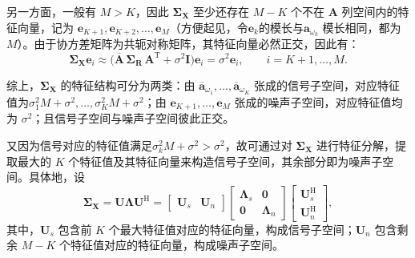 另一方面，一般有 \(M > K\)，因此 \(\mathbf{\Sigma}_{\mathbf{X}}\) 至少还存在 \(M-K\) 个不在 \(\mathbf{A}\) 列空间内的特征向量，记为 \(\bm{e}_{K+1},\bm{e}_{K+2},\dots,\bm{e}_M\)（方便起见，令\( \bm{e}_k \)的模长与\( \bm{a}_{\omega_k}\) 模长相同，都为\( M \)）。由于协方差矩阵为共轭对称矩阵，其特征向量必然正交，因此有：
\[
    \mathbf{\Sigma}_{\mathbf{X}} \bm{e}_i
    \approx \big(\overline{\mathbf{A}}\,\mathbf{\Sigma}_{\mathbf{R}}\,\mathbf{A}^{\mathrm{T}} + \sigma^2 \mathbf{I}\big)\bm{e}_i
    = \sigma^2 \bm{e}_i,\qquad i=K+1,\dots,M.
\]

综上，\(\mathbf{\Sigma}_{\mathbf{X}}\) 的特征结构可分为两类：由 \(\overline{\bm{a}}_{\omega_1},\dots,\overline{\bm{a}}_{\omega_K}\) 张成的信号子空间，对应特征值为\(\sigma_1^2 M+\sigma^2,\dots,\sigma_K^2 M+\sigma^2\)；由 \(\bm{e}_{K+1},\dots,\bm{e}_M\) 张成的噪声子空间，对应特征值均为 \(\sigma^2\)；且信号子空间与噪声子空间彼此正交。

又因为信号对应的特征值满足\(\sigma_k^2 M + \sigma^2 > \sigma^2\)，故可通过对 \(\mathbf{\Sigma}_{\mathbf{X}}\) 进行特征分解，提取最大的 \(K\) 个特征值及其特征向量来构造信号子空间，其余部分即为噪声子空间。具体地，设
\[
    \mathbf{\Sigma}_{\mathbf{X}}
    = \mathbf{U}\mathbf{\Lambda}\mathbf{U}^{\mathrm{H}}
    = \begin{bmatrix}
        \mathbf{U}_{s} & \mathbf{U}_{n}
    \end{bmatrix}
    \begin{bmatrix}
        \mathbf{\Lambda}_{s} & \mathbf{0}           \\
        \mathbf{0}           & \mathbf{\Lambda}_{n}
    \end{bmatrix}
    \begin{bmatrix}
        \mathbf{U}_{s}^{\mathrm{H}} \\
        \mathbf{U}_{n}^{\mathrm{H}}
    \end{bmatrix},
\]
其中，\(\mathbf{U}_{s}\) 包含前 \(K\) 个最大特征值对应的特征向量，构成信号子空间；\(\mathbf{U}_{n}\) 包含剩余 \(M-K\) 个特征值对应的特征向量，构成噪声子空间。

